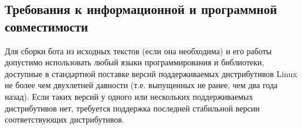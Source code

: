 \subsection{Требования к информационной и программной совместимости}
\label{sec:req:compat}
Для сборки бота из исходных текстов (если она необходима) и его работы допустимо использовать
любый языки программирования и библиотеки, доступные в стандартной поставке версий поддерживаемых
дистрибутивов Linux не более чем двухлетней давности (т.е. выпущенных не ранее, чем два
года назад). Если таких версий у одного или нескольких поддерживаемых дистрибутивов нет,
требуется поддержка последней стабильной версии соответствующих дистрибутивов.
